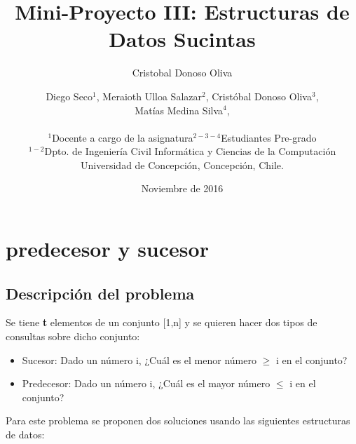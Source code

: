 \documentclass[11pt]{article}
\title{Mini-Proyecto III: Estructuras de Datos Sucintas}
\author{Cristobal Donoso Oliva}
\author{
Diego Seco$^{1}$, Meraioth Ulloa Salazar$^{2}$, Cristóbal Donoso Oliva$^{3}$,\\ Matías Medina Silva$^{4}$,\\ \\
\small{$^{1}$Docente a cargo de la asignatura$^{2-3-4}$Estudiantes Pre-grado}\\
\small{$^{1-2}$Dpto. de Ingeniería Civil Informática y Ciencias de la Computación}\\
\small{Universidad de Concepción, Concepción, Chile.}\\
}
\date{Noviembre de 2016}
\begin{document}
\maketitle


\section{predecesor y sucesor}
\subsection{Descripción del problema}
Se tiene \textbf{t} elementos de un conjunto [1,n] y se quieren hacer dos tipos de consultas sobre dicho conjunto:
\begin{itemize}
\item Sucesor: Dado un número i, ¿Cuál es el menor número $\geq$ i en el conjunto?
\item Predecesor: Dado un número i, ¿Cuál es el mayor número $\leq$ i en el conjunto?
\end{itemize}
Para este problema se proponen dos soluciones usando las siguientes estructuras de datos:
\end{document}
